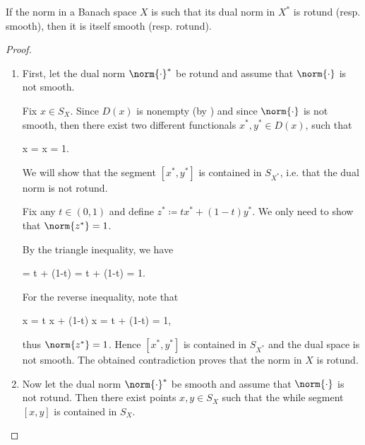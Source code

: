 \begin{theorem}\label{thm:smooth_rotund_norm_duality}\mcite\cite[exer. 2.37(a)]{Phelps1993}
  If the norm in a Banach space \( X \) is such that its dual norm in \( X^* \) is rotund (resp. smooth), then it is itself smooth (resp. rotund).
\end{theorem}
\begin{proof}
  \begin{enumerate}
    \item First, let the dual norm \( \norm{\cdot}^* \) be rotund and assume that \( \norm{\cdot} \) is not smooth.

          Fix \( x \in S_X \). Since \( D(x) \) is nonempty (by ) and since \( \norm{\cdot} \) is not smooth, then there exist two different functionals \( x^*, y^* \in D(x) \), such that
          \begin{balign*}
             x
            =
             x
            =
            1.
          \end{balign*}

          We will show that the segment \( [x^*, y^*] \) is contained in \( S_{X^*} \), i.e. that the dual norm is not rotund.

          Fix any \( t \in (0, 1) \) and define \( z^* \coloneqq t x^* + (1-t) y^* \). We only need to show that \( \norm{z^*} = 1 \).

          By the triangle inequality, we have
          \begin{balign*}
            =
            \leq
            t  + (1-t) 
            =
            t + (1-t)
            =
            1.
          \end{balign*}

          For the reverse inequality, note that
          \begin{balign*}
            \geq
             x
            =
            t  x + (1-t)  x
            =
            t + (1-t)
            =
            1,
          \end{balign*}
          thus \( \norm{z^*} = 1 \). Hence \( [x^*, y^*] \) is contained in \( S_{X^*} \) and the dual space is not smooth. The obtained contradiction proves that the norm in \( X \) is rotund.

    \item Now let the dual norm \( \norm{\cdot}^* \) be smooth and assume that \( \norm{\cdot} \) is not rotund. Then there exist points \( x, y \in S_X \) such that the while segment \( [x, y] \) is contained in \( S_X \).


\end{enumerate}
\end{proof}
